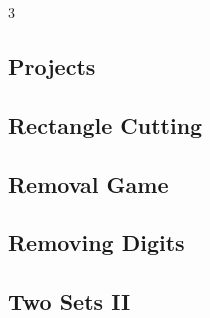 \documentclass[8pt]{extarticle}
\begin{document}
\begin{multicols*}{3}
\subsection{Projects}
\begin{caixaenunciado}

\end{caixaenunciado}
\vspace{0.3cm}


\subsection{Rectangle Cutting}
\begin{caixaenunciado}

\end{caixaenunciado}
\vspace{0.3cm}


\subsection{Removal Game}
\begin{caixaenunciado}

\end{caixaenunciado}
\vspace{0.3cm}


\subsection{Removing Digits}
\begin{caixaenunciado}

\end{caixaenunciado}
\vspace{0.3cm}


\subsection{Two Sets II}
\begin{caixaenunciado}

\end{caixaenunciado}
\vspace{0.3cm}

\end{multicols*}
\end{document}
